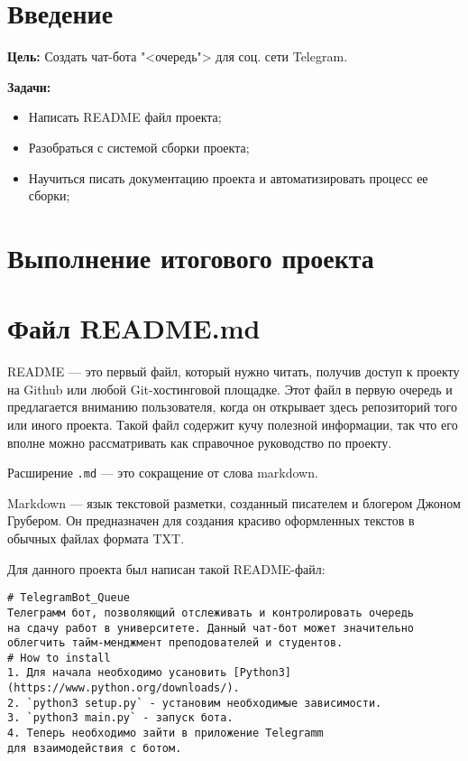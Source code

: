 \graphicspath{{./img/}} %

\section*{\LARGE{Введение}}
\textbf{Цель:} Создать чат-бота "<очередь"> для соц. сети Telegram.

\textbf{Задачи:}
\begin{itemize}
	\item Написать README файл проекта;
	\item Разобраться с системой сборки проекта;
	\item Научиться писать документацию проекта и
		автоматизировать процесс ее сборки;
\end{itemize}

\clearpage

\section*{\LARGE{Выполнение итогового проекта}}

\section{Файл README.md}
README --- это первый файл, который нужно читать, получив доступ к проекту
на Github или любой Git-хостинговой площадке. Этот файл в первую очередь
и предлагается вниманию пользователя, когда он открывает здесь репозиторий
того или иного проекта. Такой файл содержит кучу полезной информации, так что
его вполне можно рассматривать как справочное руководство по проекту.\par
Расширение \texttt{.md} --- это сокращение от слова markdown.\par
Markdown — язык текстовой разметки, созданный писателем и блогером
Джоном Грубером. Он предназначен для создания красиво оформленных текстов
в обычных файлах формата TXT.\par
Для данного проекта был написан такой README-файл:

\begin{verbatim}
# TelegramBot_Queue
Телеграмм бот, позволяющий отслеживать и контролировать очередь
на сдачу работ в университете. Данный чат-бот может значительно
облегчить тайм-менджмент преподователей и студентов.
# How to install 
1. Для начала необходимо усановить [Python3]
(https://www.python.org/downloads/).
2. `python3 setup.py` - установим необходимые зависимости.
3. `python3 main.py` - запуск бота.
4. Теперь необходимо зайти в приложение Telegramm
для взаимодействия с ботом.
\end{verbatim}

